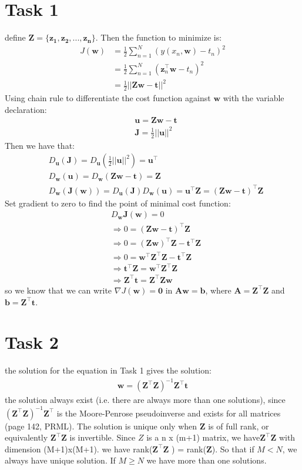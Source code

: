 \documentclass[11pt]{article}
\theoremstyle{plain}
\theoremstyle{definition}
\begin{document}
\section{Task 1}
define $\mathbf{Z} = \{ \mathbf{z_1, z_2, ..., z_n} \}$. Then the function to minimize is: 
\begin{align*}
J(\mathbf{w}) &= \frac{1}{2} \sum \limits_{n=1}^{N} (y(x_n, \mathbf{w}) - t_n)^2 \\			  
			  &= \frac{1}{2} \sum \limits_{n=1}^{N} (\mathbf{z}_n^\top \mathbf{w}-t_n)^2 \\
			  &= \frac{1}{2} || \mathbf{Zw -t}||^2
\end{align*}
Using chain rule to differentiate the cost function against $\mathbf{w}$ with the variable declaration:
\begin{align*}
& \mathbf{ u = Zw -t }\\
& \mathbf{J} = \frac{1}{2} ||\mathbf{u}||^2
\end{align*}
Then we have that: \begin{align*}
&D_\mathbf{u}(\mathbf{J}) = D_\mathbf{u} (\frac{1}{2}||\mathbf{u}||^2) = \mathbf{u^\top}     \\
&D_\mathbf{w} (\mathbf{u}) = D_\mathbf{w}(\mathbf{Zw -t}) = \mathbf{Z}\\
&D_\mathbf{w} (\mathbf{J}(\mathbf{w})) = D_\mathbf{u}(\mathbf{J})D_\mathbf{w}(\mathbf{u}) = \mathbf{u^\top Z} = \mathbf{(Zw-t)^\top Z}
\end{align*}
Set gradient to zero to find the point of minimal cost function:
\begin{align*}
&D_\mathbf{w} \mathbf{J}(\mathbf{w}) = 0 \\
&\Longrightarrow 0 = \mathbf{(Zw-t)^\top Z} \\
&\Longrightarrow 0 = \mathbf{(Zw)^\top Z - t^\top Z} \\
&\Longrightarrow 0 = \mathbf{w^\top Z^\top Z - t^\top Z} \\
&\Longrightarrow \mathbf{t^\top Z = w^\top Z^\top Z}\\
&\Longrightarrow \mathbf{Z^\top t = Z^\top Z w} 
\end{align*}
so we know that we can write $\nabla J (\mathbf{w}) = \mathbf{0}$ in $\mathbf{Aw = b}$, where $\mathbf{A = Z^\top Z}$ and $\mathbf{b = Z^\top t}$.

\section{Task 2}
the solution for the equation in Task 1 gives the solution: \begin{align*}
\mathbf{w} = \mathbf{(Z^\top Z)}^{-1} \mathbf{Z^\top t}
\end{align*}
the solution always exist (i.e. there are always more than one solutions), since $\mathbf{(Z^\top Z)}^{-1} \mathbf{Z}^\top $ is the Moore-Penrose pseudoinverse and exists for all matrices (page 142, PRML). The solution is unique only when $\mathbf{Z}$ is of full rank, or equivalently $\mathbf{Z^\top Z}$ is invertible. Since $Z$ is a n x (m+1) matrix, we have$\mathbf{Z^\top Z}$ with dimension (M+1)x(M+1). we have rank($\mathbf{Z^\top Z}$ ) = rank($\mathbf{Z}$). So that if $M < N$, we always have unique solution. If $M \geq N$ we have more than one solutions.
\end{document}
